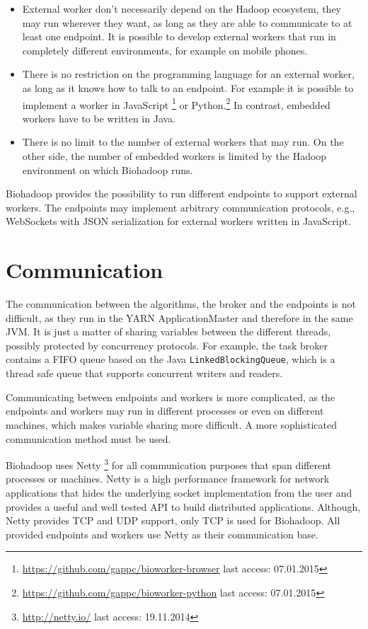 \begin{itemize}
  \item External worker don't necessarily depend on the Hadoop ecosystem, they may run wherever they want, as long as they are able to communicate to at least one endpoint. It is possible to develop external workers that run in completely different environments, for example on mobile phones.
  \item There is no restriction on the programming language for an external worker, as long as it knows how to talk to an endpoint. For example it is possible to implement a worker in JavaScript \footnote{\url{https://github.com/gappc/bioworker-browser} last access: 07.01.2015} or Python.\footnote{\url{https://github.com/gappc/bioworker-python} last access: 07.01.2015} In contrast, embedded workers have to be written in Java.
  \item There is no limit to the number of external workers that may run. On the other side, the number of embedded workers is limited by the Hadoop environment on which Biohadoop runs.
\end{itemize}

Biohadoop provides the possibility to run different endpoints to support external workers. The endpoints may implement arbitrary communication protocols, e.g., WebSockets with JSON serialization for external workers written in JavaScript.

\section{Communication}
\label{chap:impl:communication}
The communication between the algorithms, the broker and the endpoints is not difficult, as they run in the YARN ApplicationMaster and therefore in the same JVM. It is just a matter of sharing variables between the different threads, possibly protected by concurrency protocols. For example, the task broker contains a FIFO queue based on the Java \texttt{LinkedBlockingQueue}, which is a thread safe queue that supports concurrent writers and readers.
  
Communicating between endpoints and workers is more complicated, as the endpoints and workers may run in different processes or even on different machines, which makes variable sharing more difficult. A more sophisticated communication method must be used.

Biohadoop uses Netty \footnote{\url{http://netty.io/} last access: 19.11.2014} for all communication purposes that span different processes or machines. Netty is a high performance framework for network applications that hides the underlying socket implementation from the user and provides a useful and well tested API to build distributed applications. Although, Netty provides TCP and UDP support, only TCP is used for Biohadoop. All provided endpoints and workers use Netty as their communication base.

